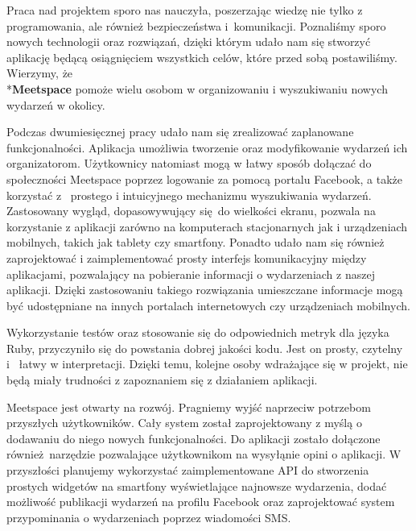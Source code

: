 Praca nad projektem sporo nas nauczyła, poszerzając wiedzę nie tylko z programowania, ale również bezpieczeństwa i~komunikacji.
Poznaliśmy sporo nowych technologii oraz rozwiązań, dzięki którym udało nam się stworzyć aplikację będącą osiągnięciem wszystkich celów, które przed sobą postawiliśmy.
Wierzymy, że \\*\textbf{Meetspace} pomoże wielu osobom w organizowaniu i wyszukiwaniu nowych wydarzeń w okolicy.

Podczas dwumiesięcznej pracy udało nam się zrealizować zaplanowane funkcjonalności.
Aplikacja umożliwia tworzenie oraz modyfikowanie wydarzeń ich organizatorom.
Użytkownicy natomiast mogą w łatwy sposób dołączać do społeczności Meetspace poprzez logowanie za pomocą portalu Facebook, a także korzystać z~ prostego i intuicyjnego mechanizmu wyszukiwania wydarzeń.
Zastosowany wygląd, dopasowywujący się do wielkości ekranu, pozwala na korzystanie z aplikacji zarówno na komputerach stacjonarnych jak i urządzeniach mobilnych, takich jak tablety czy smartfony.
Ponadto udało nam się również zaprojektować i zaimplementować prosty interfejs komunikacyjny między aplikacjami, pozwalający na pobieranie informacji o wydarzeniach z naszej aplikacji.
Dzięki zastosowaniu takiego rozwiązania umieszczane informacje mogą być udostępniane na innych portalach internetowych czy urządzeniach mobilnych.

Wykorzystanie testów oraz stosowanie się do odpowiednich metryk dla języka Ruby, przyczyniło się do powstania dobrej jakości kodu. Jest on prosty, czytelny i~ łatwy w interpretacji. Dzięki temu, kolejne osoby wdrażające się w projekt, nie będą miały trudności z zapoznaniem się z działaniem aplikacji.

Meetspace jest otwarty na rozwój. Pragniemy wyjść naprzeciw potrzebom przyszłych użytkowników. Cały system został zaprojektowany z myślą o dodawaniu do niego nowych funkcjonalności. Do aplikacji zostało dołączone również narzędzie pozwalające użytkownikom na wysyłąnie opini o aplikacji.
W przyszłości planujemy wykorzystać zaimplementowane API do stworzenia prostych widgetów na smartfony wyświetlające najnowsze wydarzenia,
dodać możliwość publikacji wydarzeń na profilu Facebook oraz zaprojektować system przypominania o wydarzeniach poprzez wiadomości SMS.
